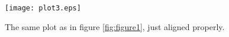 \begin{figure}[H]
    \vspace{-5mm}
    \begin{center}
        \texttt{[image: plot3.eps]}
    \end{center}
    \vspace{-15mm}
    \caption{The same plot as in figure \ref{fig:figure1}, just aligned properly.}
    \label{fig:figure2}
\end{figure}
